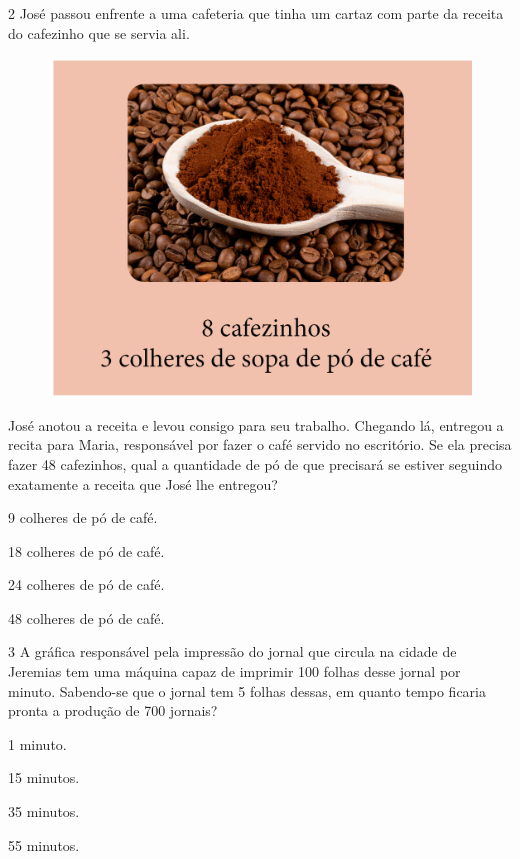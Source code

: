 \num{2} José passou enfrente a uma cafeteria que tinha um cartaz com parte
da receita do cafezinho que se servia ali.\pagebreak

\begin{figure}[htpb!]
\centering
\includegraphics[width=.8\textwidth]{../ilustracoes/MAT5/SAEB_5ANO_MAT_figura80.png}
\end{figure}

José anotou a receita e levou consigo para seu trabalho. Chegando lá,
entregou a recita para Maria, responsável por fazer o café servido no
escritório. Se ela precisa fazer 48 cafezinhos, qual a
quantidade de pó de que precisará se estiver seguindo exatamente a receita que José lhe entregou?

\begin{escolha}
\item
  9 colheres de pó de café.
\item
  18 colheres de pó de café.
\item
  24 colheres de pó de café.
\item
  48 colheres de pó de café.
\end{escolha}


\num{3} A gráfica responsável pela impressão do jornal que circula na
cidade de Jeremias tem uma máquina capaz de imprimir 100 folhas desse jornal por minuto. Sabendo-se que o jornal tem 5 folhas dessas, em
quanto tempo ficaria pronta a produção de 700 jornais?

\begin{escolha}
\item
  1 minuto.
\item
  15 minutos.
\item
  35 minutos.
\item
  55 minutos.
\end{escolha}


